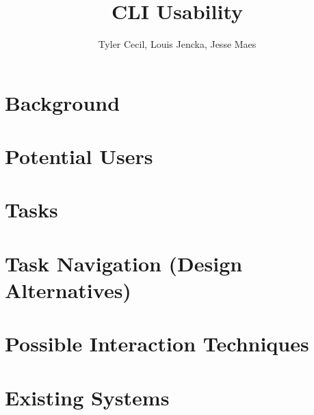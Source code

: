 \documentclass[]{article}
\title{CLI Usability}
\author{Tyler Cecil, Louis Jencka, Jesse Maes}
\begin{document}
\maketitle{}
\section{Background}
\label{sec:background}


\section{Potential Users}
\label{sec:users}


\section{Tasks}
\label{sec:tasks}


\section{Task Navigation (Design Alternatives)}
\label{sec:tas_nav}


\section{Possible Interaction Techniques}
\label{sec:interact}


\section{Existing Systems}
\label{sec:existing}


\end{document}
